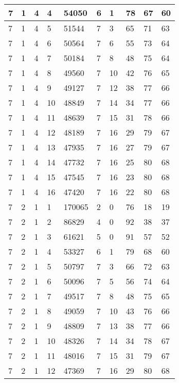 \begin{table}[!ht]
\begin{tabular}{|l|l|l|l|l|l|l|l|l|l|}
        7 & 1 & 4 & 4 & 54050 & 6 & 1 & 78 & 67 & 60 \\ \hline
        7 & 1 & 4 & 5 & 51544 & 7 & 3 & 65 & 71 & 63 \\ \hline
        7 & 1 & 4 & 6 & 50564 & 7 & 6 & 55 & 73 & 64 \\ \hline
        7 & 1 & 4 & 7 & 50184 & 7 & 8 & 48 & 75 & 64 \\ \hline
        7 & 1 & 4 & 8 & 49560 & 7 & 10 & 42 & 76 & 65 \\ \hline
        7 & 1 & 4 & 9 & 49127 & 7 & 12 & 38 & 77 & 66 \\ \hline
        7 & 1 & 4 & 10 & 48849 & 7 & 14 & 34 & 77 & 66 \\ \hline
        7 & 1 & 4 & 11 & 48639 & 7 & 15 & 31 & 78 & 66 \\ \hline
        7 & 1 & 4 & 12 & 48189 & 7 & 16 & 29 & 79 & 67 \\ \hline
        7 & 1 & 4 & 13 & 47935 & 7 & 16 & 27 & 79 & 67 \\ \hline
        7 & 1 & 4 & 14 & 47732 & 7 & 16 & 25 & 80 & 68 \\ \hline
        7 & 1 & 4 & 15 & 47545 & 7 & 16 & 23 & 80 & 68 \\ \hline
        7 & 1 & 4 & 16 & 47420 & 7 & 16 & 22 & 80 & 68 \\ \hline
        7 & 2 & 1 & 1 & 170065 & 2 & 0 & 76 & 18 & 19 \\ \hline
        7 & 2 & 1 & 2 & 86829 & 4 & 0 & 92 & 38 & 37 \\ \hline
        7 & 2 & 1 & 3 & 61621 & 5 & 0 & 91 & 57 & 52 \\ \hline
        7 & 2 & 1 & 4 & 53327 & 6 & 1 & 79 & 68 & 60 \\ \hline
        7 & 2 & 1 & 5 & 50797 & 7 & 3 & 66 & 72 & 63 \\ \hline
        7 & 2 & 1 & 6 & 50096 & 7 & 5 & 56 & 74 & 64 \\ \hline
        7 & 2 & 1 & 7 & 49517 & 7 & 8 & 48 & 75 & 65 \\ \hline
        7 & 2 & 1 & 8 & 49059 & 7 & 10 & 43 & 76 & 66 \\ \hline
        7 & 2 & 1 & 9 & 48809 & 7 & 13 & 38 & 77 & 66 \\ \hline
        7 & 2 & 1 & 10 & 48326 & 7 & 14 & 34 & 78 & 67 \\ \hline
        7 & 2 & 1 & 11 & 48016 & 7 & 15 & 31 & 79 & 67 \\ \hline
        7 & 2 & 1 & 12 & 47369 & 7 & 16 & 29 & 80 & 68 \\ \hline

\end{tabular}
\end{table}
